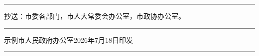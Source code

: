 \documentclass[linespread=1.81, twoside]{ctexart}
\begin{document}
\vfill
\begingroup{}\setlength{\parindent}{0pt}%
\rule{\textwidth}{0.35mm}\par
\vspace{0.25\baselineskip}
\hspace{1\ccwd}\begin{minipage}{\dimexpr\textwidth-2\ccwd\relax}
  \ccwd{}\relax
  抄送：市委各部门，市人大常委会办公室，市政协办公室。\par
\end{minipage}\par
\vspace{0.25\baselineskip}
\rule{\textwidth}{0.25mm}\par
\vspace{0.2\baselineskip}
\hspace{1\ccwd}示例市人民政府办公室\hfill 2026年7月18日印发\hspace*{1\ccwd}\par
\vspace{0.2\baselineskip}
\rule{\textwidth}{0.35mm}\par
\endgroup
\end{document}
